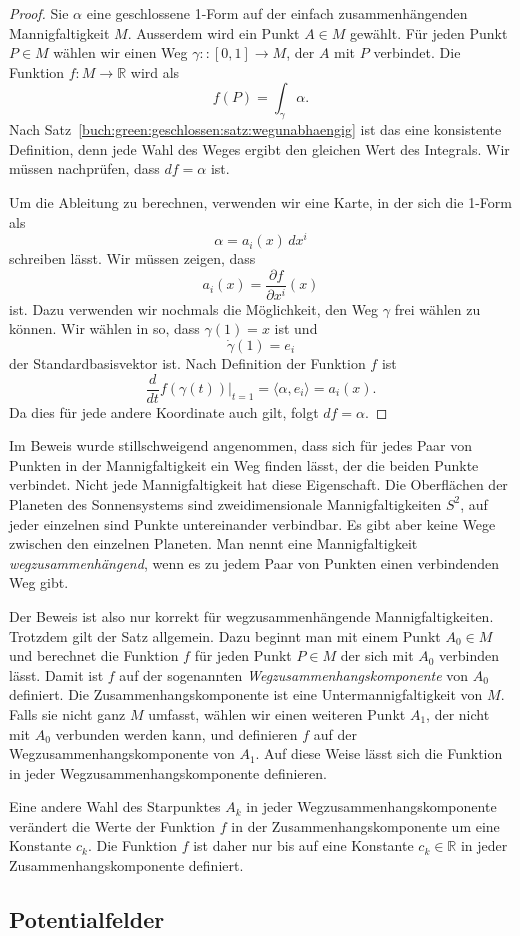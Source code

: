 \begin{proof}
Sie $\alpha$ eine geschlossene 1-Form auf der einfach zusammenhängenden
Mannigfaltigkeit $M$.
Ausserdem wird ein Punkt $A\in M$ gewählt.
Für jeden Punkt $P\in M$ wählen wir einen Weg $\gamma:\colon[0,1]\to M$,
der $A$ mit $P$ verbindet.
Die Funktion $f\colon M\to\mathbb{R}$ wird als
\[
f(P) = \int_{\gamma} \alpha.
\]
Nach Satz~\ref{buch:green:geschlossen:satz:wegunabhaengig} ist das eine
konsistente Definition, denn jede Wahl des Weges ergibt den gleichen
Wert des Integrals.
Wir müssen nachprüfen, dass $df=\alpha$ ist.

Um die Ableitung zu berechnen, verwenden wir eine Karte, in der sich die
1-Form als
\[
\alpha = a_i(x)\, dx^i
\]
schreiben lässt.
Wir müssen zeigen, dass
\[
a_i(x) = \frac{\partial f}{\partial x^i}(x)
\]
ist.
Dazu verwenden wir nochmals die Möglichkeit, den Weg $\gamma$ frei wählen
zu können.
Wir wählen in so, dass $\gamma(1)=x$ ist und
\[
\dot{\gamma}(1) = e_i
\]
der Standardbasisvektor ist.
Nach Definition der Funktion $f$ ist
\[
\frac{d}{dt}
f(\gamma(t))
\biggl|_{t=1}
=
\langle
\alpha,
e_i
\rangle
=
a_i(x).
\]
Da dies für jede andere Koordinate auch gilt, folgt $df=\alpha$.
\end{proof}

Im Beweis wurde stillschweigend angenommen, dass sich für jedes
Paar von Punkten in der Mannigfaltigkeit ein Weg finden lässt, der
die beiden Punkte verbindet.
Nicht jede Mannigfaltigkeit hat diese Eigenschaft.
Die Oberflächen der Planeten des Sonnensystems sind zweidimensionale
Mannigfaltigkeiten $S^2$, auf jeder einzelnen sind Punkte untereinander
verbindbar.
Es gibt aber keine Wege zwischen den einzelnen Planeten.
Man nennt eine Mannigfaltigkeit {\em wegzusammenhängend}, wenn es zu jedem
Paar von Punkten einen verbindenden Weg gibt.

Der Beweis ist also nur korrekt für wegzusammenhängende Mannigfaltigkeiten.
Trotzdem gilt der Satz allgemein.
Dazu beginnt man mit einem Punkt $A_0\in M$ und berechnet die Funktion $f$
für jeden Punkt $P\in M$ der sich mit $A_0$ verbinden lässt.
Damit ist $f$ auf der sogenannten {\em Wegzusammenhangskomponente} von $A_0$
definiert.
Die Zusammenhangskomponente ist eine Untermannigfaltigkeit von $M$.
Falls sie nicht ganz $M$ umfasst, wählen wir einen weiteren Punkt $A_1$,
der nicht mit $A_0$ verbunden werden kann, und definieren $f$ auf der
Wegzusammenhangskomponente von $A_1$.
Auf diese Weise lässt sich die Funktion in jeder Wegzusammenhangskomponente
definieren.

Eine andere Wahl des Starpunktes $A_k$ in jeder Wegzusammenhangskomponente
verändert die Werte der Funktion $f$ in der Zusammenhangskomponente
um eine Konstante $c_k$.
Die Funktion $f$ ist daher nur bis auf eine Konstante $c_k\in\mathbb{R}$
in jeder Zusammenhangskomponente definiert.




%
%
\subsection{Potentialfelder}




